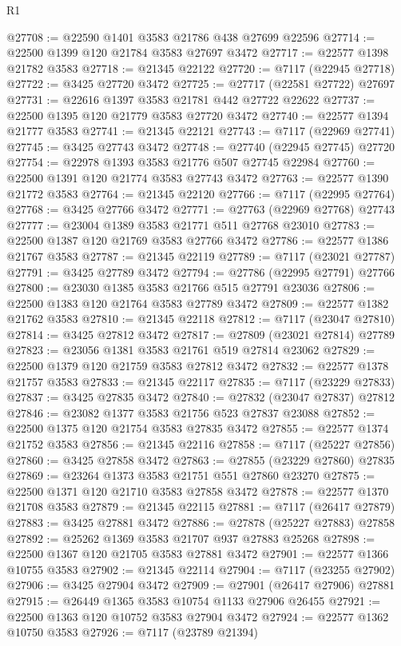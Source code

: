 \begin{lexlean}{R1}
\begin{coremodule}
@27708 := @22590 @1401 @3583 @21786 @438 @27699 @22596
@27714 := @22500 @1399 @120 @21784 @3583 @27697 @3472
@27717 := @22577 @1398 @21782 @3583
@27718 := @21345 @22122
@27720 := @7117 (@22945 @27718)
@27722 := @3425 @27720 @3472
@27725 := @27717 (@22581 @27722) @27697
@27731 := @22616 @1397 @3583 @21781 @442 @27722 @22622
@27737 := @22500 @1395 @120 @21779 @3583 @27720 @3472
@27740 := @22577 @1394 @21777 @3583
@27741 := @21345 @22121
@27743 := @7117 (@22969 @27741)
@27745 := @3425 @27743 @3472
@27748 := @27740 (@22945 @27745) @27720
@27754 := @22978 @1393 @3583 @21776 @507 @27745 @22984
@27760 := @22500 @1391 @120 @21774 @3583 @27743 @3472
@27763 := @22577 @1390 @21772 @3583
@27764 := @21345 @22120
@27766 := @7117 (@22995 @27764)
@27768 := @3425 @27766 @3472
@27771 := @27763 (@22969 @27768) @27743
@27777 := @23004 @1389 @3583 @21771 @511 @27768 @23010
@27783 := @22500 @1387 @120 @21769 @3583 @27766 @3472
@27786 := @22577 @1386 @21767 @3583
@27787 := @21345 @22119
@27789 := @7117 (@23021 @27787)
@27791 := @3425 @27789 @3472
@27794 := @27786 (@22995 @27791) @27766
@27800 := @23030 @1385 @3583 @21766 @515 @27791 @23036
@27806 := @22500 @1383 @120 @21764 @3583 @27789 @3472
@27809 := @22577 @1382 @21762 @3583
@27810 := @21345 @22118
@27812 := @7117 (@23047 @27810)
@27814 := @3425 @27812 @3472
@27817 := @27809 (@23021 @27814) @27789
@27823 := @23056 @1381 @3583 @21761 @519 @27814 @23062
@27829 := @22500 @1379 @120 @21759 @3583 @27812 @3472
@27832 := @22577 @1378 @21757 @3583
@27833 := @21345 @22117
@27835 := @7117 (@23229 @27833)
@27837 := @3425 @27835 @3472
@27840 := @27832 (@23047 @27837) @27812
@27846 := @23082 @1377 @3583 @21756 @523 @27837 @23088
@27852 := @22500 @1375 @120 @21754 @3583 @27835 @3472
@27855 := @22577 @1374 @21752 @3583
@27856 := @21345 @22116
@27858 := @7117 (@25227 @27856)
@27860 := @3425 @27858 @3472
@27863 := @27855 (@23229 @27860) @27835
@27869 := @23264 @1373 @3583 @21751 @551 @27860 @23270
@27875 := @22500 @1371 @120 @21710 @3583 @27858 @3472
@27878 := @22577 @1370 @21708 @3583
@27879 := @21345 @22115
@27881 := @7117 (@26417 @27879)
@27883 := @3425 @27881 @3472
@27886 := @27878 (@25227 @27883) @27858
@27892 := @25262 @1369 @3583 @21707 @937 @27883 @25268
@27898 := @22500 @1367 @120 @21705 @3583 @27881 @3472
@27901 := @22577 @1366 @10755 @3583
@27902 := @21345 @22114
@27904 := @7117 (@23255 @27902)
@27906 := @3425 @27904 @3472
@27909 := @27901 (@26417 @27906) @27881
@27915 := @26449 @1365 @3583 @10754 @1133 @27906 @26455
@27921 := @22500 @1363 @120 @10752 @3583 @27904 @3472
@27924 := @22577 @1362 @10750 @3583
@27926 := @7117 (@23789 @21394)

\end{coremodule}
\end{lexlean}
